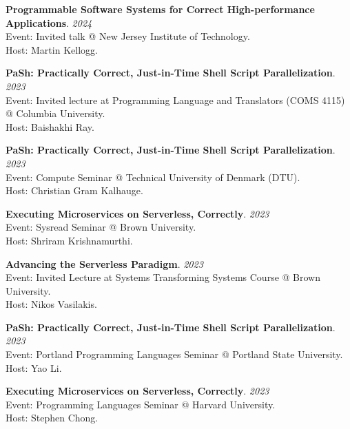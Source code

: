 \begin{minipage}{\textwidth}
\textbf{Programmable Software Systems for Correct High-performance Applications}. \hfill {\em 2024}\\
Event: Invited talk @ New Jersey Institute of Technology.\\
 Host: Martin Kellogg.
\end{minipage}

\begin{minipage}{\textwidth}
\textbf{PaSh: Practically Correct, Just-in-Time Shell Script Parallelization}. \hfill {\em 2023}\\
Event: Invited lecture at Programming Language and Translators (COMS 4115) @ Columbia University.\\
 Host: Baishakhi Ray.
\end{minipage}

\begin{minipage}{\textwidth}
\textbf{PaSh: Practically Correct, Just-in-Time Shell Script Parallelization}. \hfill {\em 2023}\\
Event: Compute Seminar @ Technical University of Denmark (DTU).\\
 Host: Christian Gram Kalhauge.
\end{minipage}

\begin{minipage}{\textwidth}
\textbf{Executing Microservices on Serverless, Correctly}. \hfill {\em 2023}\\
Event: Sysread Seminar @ Brown University.\\
 Host: Shriram Krishnamurthi.
\end{minipage}

\begin{minipage}{\textwidth}
\textbf{Advancing the Serverless Paradigm}. \hfill {\em 2023}\\
Event: Invited Lecture at Systems Transforming Systems Course @ Brown University.\\
 Host: Nikos Vasilakis.
\end{minipage}

\begin{minipage}{\textwidth}
\textbf{PaSh: Practically Correct, Just-in-Time Shell Script Parallelization}. \hfill {\em 2023}\\
Event: Portland Programming Languages Seminar @ Portland State University.\\
 Host: Yao Li.
\end{minipage}

\begin{minipage}{\textwidth}
\textbf{Executing Microservices on Serverless, Correctly}. \hfill {\em 2023}\\
Event: Programming Languages Seminar @ Harvard University.\\
 Host: Stephen Chong.
\end{minipage}

